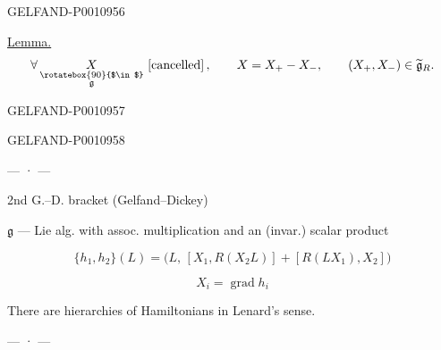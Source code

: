 \begin{GelfandAdjacentEvidence}{GELFAND-P001095}{6}


\underline{Lemma.}
\[
\forall\,\underset{\substack{\rotatebox{90}{$\in$}\\ \mathfrak g}}{X}
\ [\text{cancelled}]\,,
\qquad X=X_+-X_-,
\qquad (X_+,X_-)\in\widetilde{\mathfrak g}_R.
\]
\end{GelfandAdjacentEvidence}
\begin{GelfandAdjacentEvidence}{GELFAND-P001095}{7}

\end{GelfandAdjacentEvidence}
\begin{GelfandAdjacentEvidence}{GELFAND-P001095}{8}


\begin{center}— · —\end{center}

2nd G.–D. bracket (Gelfand–Dickey)

$\mathfrak g$ — Lie alg. with assoc. multiplication and an (invar.) scalar product

\[
\{h_1,h_2\}(L)=\bigl(L,\,[X_1,R(X_2L)]+[R(LX_1),X_2]\bigr)
\]
\end{GelfandAdjacentEvidence}

\[
X_i=\operatorname{grad}h_i
\]

There are hierarchies of Hamiltonians in Lenard’s sense.

\begin{center}— · —\end{center}


